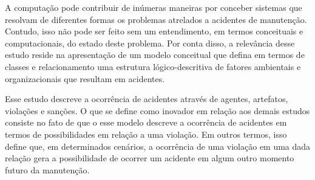 A computação pode contribuir de inúmeras maneiras por conceber sistemas que resolvam de diferentes formas os problemas atrelados a acidentes de manutenção. Contudo, isso não pode ser feito sem um entendimento, em termos conceituais e computacionais, do estado deste problema. Por conta disso, a relevância desse estudo reside na apresentação de um modelo conceitual que defina em termos de classes e relacionamento uma estrutura lógico-descritiva de fatores ambientais e organizacionais que resultam em acidentes. 

Esse estudo descreve a ocorrência de acidentes através de agentes, artefatos, violações e sanções. O que se define como inovador em relação aos demais estudos consiste no fato de que o esse modelo descreve a ocorrência de acidentes em termos de possibilidades em relação a uma violação. Em outros termos, isso define que, em determinados cenários, a ocorrência de uma violação em uma dada relação gera a possibilidade de ocorrer um acidente em algum outro momento futuro da manutenção.  